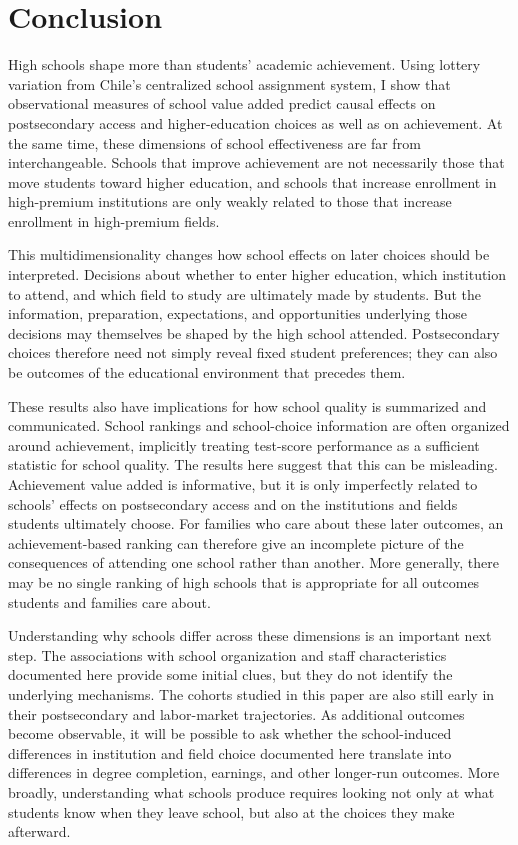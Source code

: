 \documentclass[a4paper, article, english, oneside, unknownkeysallowed, 12pt]{memoir}
\begin{document}
\clearpage 

\section{Conclusion}
\label{sec:conclusion}

High schools shape more than students' academic achievement. 
Using lottery variation from Chile's centralized school assignment system, I show that observational measures of school value added predict causal effects on postsecondary access and higher-education choices as well as on achievement. 
At the same time, these dimensions of school effectiveness are far from interchangeable. 
Schools that improve achievement are not necessarily those that move students toward higher education, and schools that increase enrollment in high-premium institutions are only weakly related to those that increase enrollment in high-premium fields.

This multidimensionality changes how school effects on later choices should be interpreted. 
Decisions about whether to enter higher education, which institution to attend, and which field to study are ultimately made by students. 
But the information, preparation, expectations, and opportunities underlying those decisions may themselves be shaped by the high school attended. 
Postsecondary choices therefore need not simply reveal fixed student preferences; they can also be outcomes of the educational environment that precedes them.

These results also have implications for how school quality is summarized and communicated. 
School rankings and school-choice information are often organized around achievement, implicitly treating test-score performance as a sufficient statistic for school quality. 
The results here suggest that this can be misleading. 
Achievement value added is informative, but it is only imperfectly related to schools' effects on postsecondary access and on the institutions and fields students ultimately choose. 
For families who care about these later outcomes, an achievement-based ranking can therefore give an incomplete picture of the consequences of attending one school rather than another. More generally, there may be no single ranking of high schools that is appropriate for all outcomes students and families care about.

Understanding why schools differ across these dimensions is an important next step. 
The associations with school organization and staff characteristics documented here provide some initial clues, but they do not identify the underlying mechanisms. 
The cohorts studied in this paper are also still early in their postsecondary and labor-market trajectories. 
As additional outcomes become observable, it will be possible to ask whether the school-induced differences in institution and field choice documented here translate into differences in degree completion, earnings, and other longer-run outcomes.
More broadly, understanding what schools produce requires looking not only at what students know when they leave school, but also at the choices they make afterward.
\end{document}
